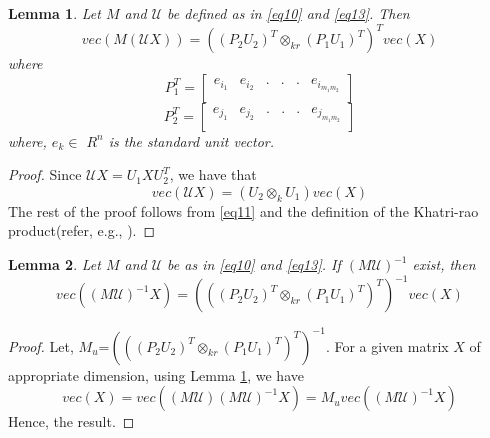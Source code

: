 \documentclass{article}
\newtheorem{lemma}{Lemma}
\begin{document}
\begin{lemma}\label{lem:lem41}
Let $M$ and $\mathcal{U}$ be defined as in \eqref{eq10} and \eqref{eq13}. Then
\begin{equation}\label{eq27}
    vec(M(\mathcal{U}X))=((P_2U_2)^T \otimes_{kr} (P_1U_1)^T )^T vec(X)
\end{equation}
        where
        \[P_1^T=\begin{bmatrix}
                    e_{i_1} & e_{i_2}  & .&.&.&e_{i_{m_1m_2}}\\
                \end{bmatrix}\]
         \[P_2^T=\begin{bmatrix}
                    e_{j_1} & e_{j_2}  & .&.&.&e_{j_{m_1m_2}}\\
                \end{bmatrix}       
                \]
        where, $e_k \in$ $R^n$ is the standard unit vector.
\end{lemma}
\begin{proof}
 Since $\mathcal{U}X=U_1XU_2^T$, we have that 
 \begin{equation*}
     vec(\mathcal{U}X)= (U_2 \otimes_k U_1) vec(X)
 \end{equation*}
 The rest of the proof follows from \eqref{eq11} and the definition of the Khatri-rao product(refer, e.g., \cite{Kolda}).
\end{proof}
\begin{lemma}\label{lem:lem42}
Let $M$ and $\mathcal{U}$ be as in \eqref{eq10} and \eqref{eq13}. If $(M\mathcal{U})^{-1}$ exist, then 
\begin{equation*}
    vec((M\mathcal{U})^{-1}X)=(((P_2U_2)^T\otimes _{kr}(P_1U_1)^T)^T)^{-1}vec(X)
\end{equation*}
\end{lemma}
\begin{proof}
  Let, $M_u$=$(((P_2U_2)^T\otimes _{kr}(P_1U_1)^T)^T)^{-1}$. For a given matrix $X$ of appropriate dimension, using Lemma \ref{lem:lem41}, we have
  \begin{equation*}
      vec(X)=vec((M\mathcal{U})(M\mathcal{U})^{-1}X)=M_u vec((M\mathcal{U})^{-1}X)
  \end{equation*}
Hence, the result. 
\end{proof}
\end{document}
